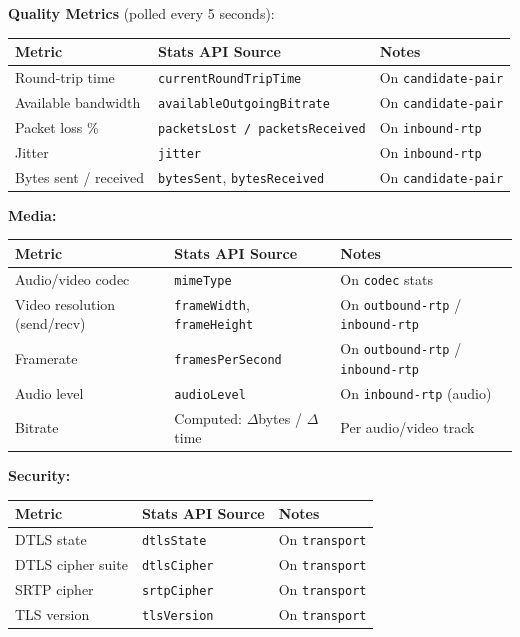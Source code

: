 \documentclass[11pt,letterpaper]{article}
\begin{document}
\textbf{Quality Metrics} (polled every 5 seconds):
\begin{center}
\begin{tabularx}{\textwidth}{L{5cm}L{4.5cm}L{4cm}}
\toprule
\textbf{Metric} & \textbf{Stats API Source} & \textbf{Notes} \\
\midrule
Round-trip time & \texttt{currentRoundTripTime} & On \texttt{candidate-pair} \\
Available bandwidth & \texttt{availableOutgoingBitrate} & On \texttt{candidate-pair} \\
Packet loss \% & \texttt{packetsLost / packetsReceived} & On \texttt{inbound-rtp} \\
Jitter & \texttt{jitter} & On \texttt{inbound-rtp} \\
Bytes sent / received & \texttt{bytesSent}, \texttt{bytesReceived} & On \texttt{candidate-pair} \\
\bottomrule
\end{tabularx}
\end{center}

\textbf{Media:}
\begin{center}
\begin{tabularx}{\textwidth}{L{5cm}L{4.5cm}L{4cm}}
\toprule
\textbf{Metric} & \textbf{Stats API Source} & \textbf{Notes} \\
\midrule
Audio/video codec & \texttt{mimeType} & On \texttt{codec} stats \\
Video resolution (send/recv) & \texttt{frameWidth}, \texttt{frameHeight} & On \texttt{outbound-rtp} / \texttt{inbound-rtp} \\
Framerate & \texttt{framesPerSecond} & On \texttt{outbound-rtp} / \texttt{inbound-rtp} \\
Audio level & \texttt{audioLevel} & On \texttt{inbound-rtp} (audio) \\
Bitrate & Computed: $\Delta$bytes / $\Delta$time & Per audio/video track \\
\bottomrule
\end{tabularx}
\end{center}

\textbf{Security:}
\begin{center}
\begin{tabularx}{\textwidth}{L{5cm}L{4.5cm}L{4cm}}
\toprule
\textbf{Metric} & \textbf{Stats API Source} & \textbf{Notes} \\
\midrule
DTLS state & \texttt{dtlsState} & On \texttt{transport} \\
DTLS cipher suite & \texttt{dtlsCipher} & On \texttt{transport} \\
SRTP cipher & \texttt{srtpCipher} & On \texttt{transport} \\
TLS version & \texttt{tlsVersion} & On \texttt{transport} \\
\bottomrule
\end{tabularx}
\end{center}
\end{document}
